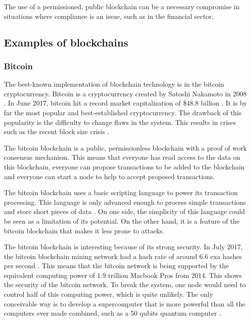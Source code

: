 The use of a permissioned, public blockchain can be a necessary compromise in situations where compliance is an issue, such as in the financial sector.


\subsection{Examples of blockchains}

\subsubsection{Bitcoin}


The best-known implementation of blockchain technology is in the bitcoin cryptocurrency. Bitcoin is a cryptocurrency created by Satoshi Nakamoto in 2008 \cite{bitcoin-paper}. In June 2017, bitcoin hit a record market capitalization of \$48.8 billion \cite{bitcoin-market-cap}. It is by far the most popular and best-established cryptocurrency. The drawback of this popularity is the difficulty to change flaws in the system. This results in crises such as the recent block size crisis \cite{bitcoin-civil-war}.

The bitcoin blockchain is a public, permissionless blockchain with a proof of work consensus mechanism. This means that everyone has read access to the data on this blockchain, everyone can propose transactions to be added to the blockchain and everyone can start a node to help to accept proposed transactions.

The bitcoin blockchain uses a basic scripting language to power its transaction processing. This language is only advanced enough to process simple transactions and store short pieces of data \cite{antonopoulos:2014}. On one side, the simplicity of this language could be seen as a limitation of its potential. On the other hand, it is a feature of the bitcoin blockchain that makes it less prone to attacks.

The bitcoin blockchain is interesting because of its strong security. In July 2017, the bitcoin blockchain mining network had a hash rate of around 6.6 exa hashes per second \cite{bitcoin-hash-rate}. This means that the bitcoin network is being supported by the equivalent computing power of 1.9 trillion Macbook Pros from 2014. This shows the security of the bitcoin network. To break the system, one node would need to control half of this computing power, which is quite unlikely. The only conceivable way is to develop a supercomputer that is more powerful than all the computers ever made combined, such as a 50 qubits quantum computer \cite{quantum-newsweek}.

